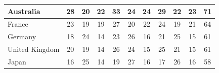 \documentclass[12pt]{article}  %
\begin{document}
\begin{longtable}{l|c|c|c|c|c|c|c|c|c|c}
	\hline
	Australia            & 28                                                                     & 20                                                                     & 22                                                                     & 33                                                                     & 24                                                                     & 24                                                                     & 29                        & 22                          & 23                          & 71                         \\ 
	\hline
	France               & 23                                                                     & 19                                                                     & 19                                                                     & 27                                                                     & 20                                                                     & 22                                                                     & 24                        & 19                          & 21                          & 64                         \\ 
	\hline
	Germany              & 18                                                                     & 24                                                                     & 14                                                                     & 23                                                                     & 26                                                                     & 16                                                                     & 21                        & 25                          & 15                          & 61                         \\ 
	\hline
	United Kingdom       & 20                                                                     & 19                                                                     & 14                                                                     & 26                                                                     & 24                                                                     & 15                                                                     & 25                        & 21                          & 15                          & 61                         \\ 
	\hline
	Japan                & 16                                                                     & 25                                                                     & 14                                                                     & 19                                                                     & 27                                                                     & 16                                                                     & 17                        & 26                          & 16                          & 58                         \\ 

\end{longtable}
\end{document}
